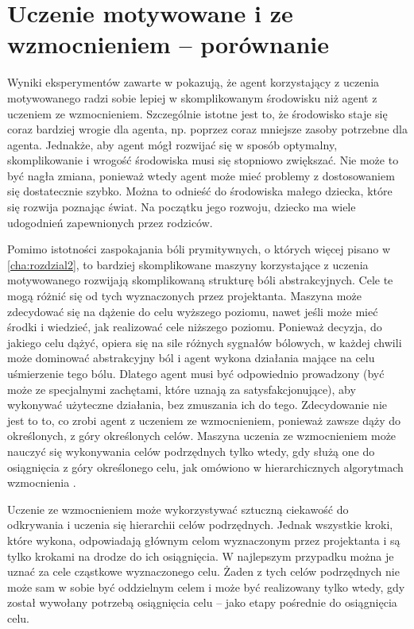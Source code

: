 \chapter{Uczenie motywowane i ze wzmocnieniem -- porównanie}
\label{cha:rozdzial4}

Wyniki eksperymentów zawarte w \cite{ml_comp_int} pokazują, że agent 
korzystający z uczenia motywowanego radzi sobie lepiej w skomplikowanym 
środowisku niż agent z uczeniem ze wzmocnieniem. Szczególnie istotne jest to, 
że środowisko staje się coraz bardziej wrogie dla agenta, np. poprzez coraz 
mniejsze zasoby potrzebne dla agenta. Jednakże, aby agent mógł rozwijać się w 
sposób optymalny, skomplikowanie i wrogość środowiska musi się stopniowo 
zwiększać. Nie może to być nagła zmiana, ponieważ wtedy agent może mieć 
problemy z dostosowaniem się dostatecznie szybko. Można to odnieść do 
środowiska małego dziecka, które się rozwija poznając świat. Na początku jego 
rozwoju, dziecko ma wiele udogodnień zapewnionych przez rodziców.

Pomimo istotności zaspokajania bóli prymitywnych, o których więcej pisano w 
\ref{cha:rozdzial2}, to bardziej skomplikowane maszyny korzystające z uczenia 
motywowanego rozwijają skomplikowaną strukturę bóli abstrakcyjnych. Cele te 
mogą różnić się od tych wyznaczonych przez projektanta. Maszyna może zdecydować 
się na dążenie do celu wyższego poziomu, nawet jeśli może mieć środki i 
wiedzieć, jak realizować cele niższego poziomu. Ponieważ decyzja, do jakiego 
celu dążyć, opiera się na sile różnych sygnałów bólowych, w każdej chwili może 
dominować abstrakcyjny ból i agent wykona działania mające na celu 
uśmierzenie tego bólu. Dlatego agent musi być odpowiednio prowadzony (być 
może ze specjalnymi zachętami, które uznają za satysfakcjonujące), aby 
wykonywać użyteczne działania, bez zmuszania ich do tego. Zdecydowanie nie jest 
to to, co zrobi agent z uczeniem ze wzmocnieniem, ponieważ zawsze dąży do 
określonych, z góry określonych celów. Maszyna uczenia ze wzmocnieniem może 
nauczyć się wykonywania celów podrzędnych tylko wtedy, gdy służą one do 
osiągnięcia z góry określonego celu, jak omówiono w hierarchicznych algorytmach 
wzmocnienia \cite{hrl_bakker}.

Uczenie ze wzmocnieniem może wykorzystywać sztuczną ciekawość do odkrywania i 
uczenia się hierarchii  celów podrzędnych. Jednak wszystkie kroki, które 
wykona, odpowiadają głównym celom wyznaczonym przez projektanta i są tylko 
krokami na drodze do ich osiągnięcia. W najlepszym przypadku można je uznać za 
cele cząstkowe wyznaczonego celu. Żaden z tych celów podrzędnych nie może sam w 
sobie być oddzielnym celem i może być realizowany tylko wtedy, gdy został 
wywołany potrzebą osiągnięcia celu -- jako etapy pośrednie do osiągnięcia celu.

